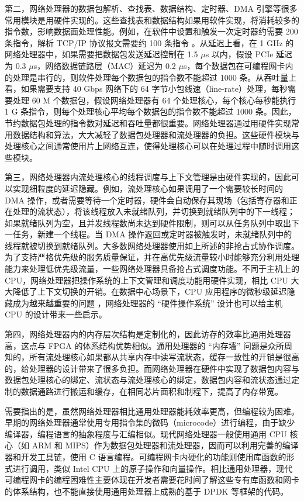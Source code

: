 第二，网络处理器的数据包解析、查找表、数据结构、定时器、DMA 引擎等很多常用模块是用硬件实现的。这些查找表和数据结构如果用软件实现，将消耗较多的指令数，影响数据面处理性能。例如，在软件中设置和触发一次定时器约需要 200 条指令，解析 TCP/IP 协议报文需要约 100 条指令 \cite{clark1989analysis}。从延迟上看，在 1 GHz 的网络处理器中，如果需要把数据包发送延迟控制在 1.5 $\mu$s 以内，假设 PCIe 延迟为 0.3 $\mu$s，网络数据链路层（MAC）延迟为 0.2 $\mu$s，每个数据包在可编程网卡内的处理是串行的，则软件处理每个数据包的指令数不能超过 1000 条。从吞吐量上看，如果需要支持 40 Gbps 网络下的 64 字节小包线速（line-rate）处理，每秒需要处理 60 M 个数据包，假设网络处理器有 64 个处理核心，每个核心每秒能执行 1 G 条指令，则每个处理核心平均每个数据包的指令数不能超过 1000 条。因此，节约数据包处理的指令数对延迟和吞吐量都很重要。网络处理器通过用硬件实现常用数据结构和算法，大大减轻了数据包处理器和流处理器的负担。这些硬件模块与处理核心之间通常使用片上网络互连，使得处理核心可以在处理过程中随时调用这些模块。

第三，网络处理器内流处理核心的线程调度与上下文管理是由硬件实现的，因此可以实现细粒度的延迟隐藏。例如，流处理核心如果调用了一个需要较长时间的 DMA 操作，或者需要等待一个定时器，硬件会自动保存其现场（包括寄存器和正在处理的流状态），将该线程放入未就绪队列，并切换到就绪队列中的下一线程；如果就绪队列为空，且并发线程数尚未达到硬件限制，则可以从任务队列中取出下一任务，新建一个线程。当 DMA 操作返回或定时器被触发时，未就绪队列中的线程就被切换到就绪队列。大多数网络处理器使用如上所述的非抢占式协作调度。为了支持严格优先级的服务质量保证，并在高优先级流量较小时能够充分利用处理能力来处理低优先级流量，一些网络处理器具备抢占式调度功能。不同于主机上的 CPU，网络处理器把操作系统的上下文管理和调度功能用硬件实现，相比 CPU 大大降低了上下文切换的开销。在数据中心场景下，CPU 应用程序的微秒级延迟隐藏成为越来越重要的问题 \cite{barroso2017attack}，网络处理器的 ``硬件操作系统'' 设计也可以给主机 CPU 的设计带来一些启示。

第四，网络处理器内的内存层次结构是定制化的，因此访存的效率比通用处理器高，这点与 FPGA 的体系结构优势相似。通用处理器的 ``内存墙'' 问题是众所周知的，所有流处理核心如果都从共享内存中读写流状态，缓存一致性的开销是很高的，给处理器的设计带来了很多负担。而网络处理器在硬件中实现了数据包内容与数据包处理核心的绑定、流状态与流处理核心的绑定，数据包内容和流状态通过定制的数据通路进行搬运和缓存，在相同芯片面积和制程下，提高了内存带宽。

需要指出的是，虽然网络处理器相比通用处理器能耗效率更高，但编程较为困难。早期的网络处理器通常使用专用指令集的微码（microcode）进行编程，由于缺少编译器，编程语言的抽象程度与汇编相似。现代网络处理器一般使用通用 CPU 核心（如 ARM 和 MIPS）作为数据包处理器和流处理器，因而可以利用完善的编译器和开发工具链，使用 C 语言编程。可编程网卡内硬化的功能则使用库函数的形式进行调用，类似 Intel CPU 上的原子操作和向量操作。相比通用处理器，现代可编程网卡的编程困难性主要体现在开发者需要花时间了解这些专有库函数和网卡的体系结构，也不能直接使用通用处理器上成熟的基于 DPDK 等框架的代码。

